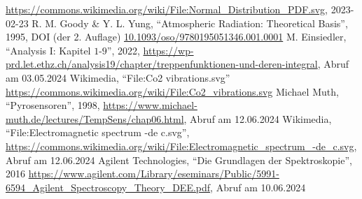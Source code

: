 \documentclass[12pt,a4paper]{scrartcl}
\numberwithin{equation}{section} %
\begin{document}
\begin{thebibliography}{9}
	\url{https://commons.wikimedia.org/wiki/File:Normal_Distribution_PDF.svg},
	2023-02-23
	R. M. Goody \& Y. L. Yung, ``Atmospheric Radiation: Theoretical Basis'', 1995,
	DOI  (der 2. Auflage) \href{https://doi.org/10.1093/oso/9780195051346.001.0001}{10.1093/oso/9780195051346.001.0001}
	M. Einsiedler, ``Analysis I: Kapitel $1$-$9$'', 2022,
	\url{https://wp-prd.let.ethz.ch/analysis19/chapter/treppenfunktionen-und-deren-integral},
	Abruf am 03.05.2024
	Wikimedia, ``File:Co2 vibrations.svg''
	\url{https://commons.wikimedia.org/wiki/File:Co2_vibrations.svg}
	Michael Muth, ``Pyrosensoren'', 1998,
	\url{https://www.michael-muth.de/lectures/TempSens/chap06.html}, Abruf am 12.06.2024
	Wikimedia, ``File:Electromagnetic spectrum -de c.svg'',
	\url{https://commons.wikimedia.org/wiki/File:Electromagnetic_spectrum_-de_c.svg}, Abruf am 12.06.2024
	Agilent Technologies, ``Die Grundlagen der Spektroskopie'', 2016
	\url{https://www.agilent.com/Library/eseminars/Public/5991-6594_Agilent_Spectroscopy_Theory_DEE.pdf},
	Abruf am 10.06.2024
\end{thebibliography}
\end{document}
